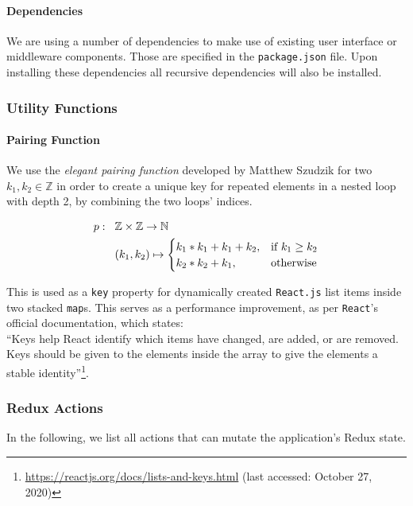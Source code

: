 \paragraph{Dependencies}
We are using a number of dependencies to make use of existing user interface or middleware components. Those are specified in the \texttt{package.json} file. Upon installing these dependencies all recursive dependencies will also be installed.

\subsubsection{Utility Functions}
\paragraph{Pairing Function}
We use the \textit{elegant pairing function} developed by Matthew Szudzik \cite{szudzik2006elegant} for two $k_1,k_2 \in \mathbb{Z}$ in order to create a unique key for repeated elements in a nested loop with depth 2, by combining the two loops' indices.

\begin{equation}
    \begin{aligned}
        p: \hspace{0.3cm} & \mathbb{Z} \times \mathbb{Z} \rightarrow \mathbb{N}\\
        & (k_1,k_2) \mapsto
        \begin{cases}
        k_1 * k_1 + k_1 + k_2, & \text{if}\ k_1 \geq k_2 \\
        k_2 * k_2 + k_1, & \text{otherwise}
        \end{cases}
    \end{aligned}
\end{equation}

This is used as a \texttt{key} property for dynamically created \texttt{React.js} list items inside two stacked \texttt{map}s. This serves as a performance improvement, as per \texttt{React}'s official documentation, which states:\\
``Keys help React identify which items have changed, are added, or are removed. Keys should be given to the elements inside the array to give the elements a stable identity''\footnote{\url{https://reactjs.org/docs/lists-and-keys.html} (last accessed: October 27, 2020)}.

\subsubsection{Redux Actions}
In the following, we list all actions that can mutate the application's Redux state.


